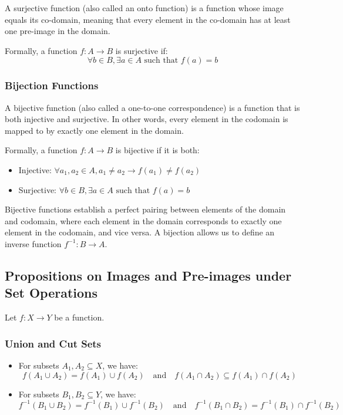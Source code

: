 A surjective function (also called an onto function) is a function whose image equals its co-domain, meaning that every element in the 
co-domain has at least one pre-image in the domain.

Formally, a function \(f: A \to B\) is surjective if:
\[
	\forall b \in B, \exists a \in A \text{ such that } f(a) = b
\]

\subsubsection*{Bijection Functions}

A bijective function (also called a one-to-one correspondence) is a function that is both injective and surjective. In other words, every element in the codomain is mapped to by exactly one element in the domain.

Formally, a function \(f: A \to B\) is bijective if it is both:
\begin{itemize}[label=\(-\)]
	\item Injective: \(\forall a_1, a_2 \in A, a_1 \neq a_2 \to f(a_1) \neq f(a_2)\)
	\item Surjective: \(\forall b \in B, \exists a \in A \text{ such that } f(a) = b\)
\end{itemize}
 Bijective functions establish a perfect pairing between elements of the domain and codomain, where each element in the domain corresponds to exactly one element in the codomain, and vice versa. A bijection allows us to define an inverse function \(f^{-1}: B \to A\).

\subsection{Propositions on Images and Pre-images under Set Operations}

Let \( f : X \to Y \) be a function.

\subsubsection{Union and Cut Sets}

\begin{itemize}[label=\(-\)]
	\item For subsets \( A_1, A_2 \subseteq X \), we have:
	      \[
		      f(A_1 \cup A_2) = f(A_1) \cup f(A_2)
		      \quad \text{and} \quad
		      f(A_1 \cap A_2) \subseteq f(A_1) \cap f(A_2)
	      \]

	\item For subsets \( B_1, B_2 \subseteq Y \), we have:
	      \[
		      f^{-1}(B_1 \cup B_2) = f^{-1}(B_1) \cup f^{-1}(B_2)
		      \quad \text{and} \quad
		      f^{-1}(B_1 \cap B_2) = f^{-1}(B_1) \cap f^{-1}(B_2)
	      \]
\end{itemize}

